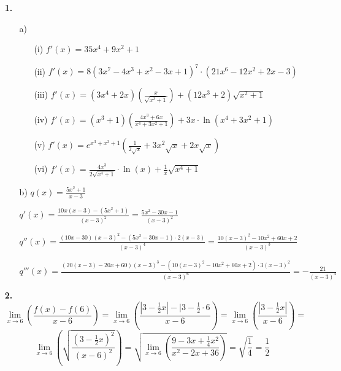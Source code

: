 \documentclass[a4paper,11pt]{scrartcl}
\author{\authorinfo}
\title{\titleinfo}
\date{\today}
\newcommand{\bra}[1]{\left(#1\right)}
\begin{document}
\maketitle
\begin{enumerate}
    \item[\textbf{1.}]
    \begin{enumerate}
        \item[a)]
        \begin{enumerate}
            \item[(i)]  \( f'(x) = 35x^4 + 9x^2 + 1 \)
            \item[(ii)] \( f'(x) = 8(3x^7 - 4x^3 + x^2 - 3x + 1)^7 \cdot (21x^6 - 12x^2 + 2x -3) \)
            \item[(iii)]\( f'(x) = (3x^4 + 2x)(\frac{x}{\sqrt{x^2+1}}) + (12x^3 + 2) \sqrt{x^2 + 1} \)
            \item[(iv)] \( f'(x) = (x^3 + 1)(\frac{4x^3+6x}{x^4+3x^2+1}) + 3x \cdot \ln\bra{x^4+3x^2+1} \)
            \item[(v)]  \( f'(x) = e^{x^3 + x^2 +1} \bra{\frac{1}{2\sqrt{x}} + 3x^2\sqrt{x} + 2x\sqrt{x}} \)
            \item[(vi)] \( f'(x) = \frac{4x^3}{2\sqrt{x^4+1}} \cdot \ln(x) + \frac{1}{x} \sqrt{x^4 + 1} \)
        \end{enumerate}

        \item[b)]
            \( q(x) = \frac{5x^2+1}{x-3} \)

            \( q'(x) = \frac{10x(x - 3) - (5x^2 + 1)}{(x-3)^2} = \frac{5x^2 - 30x - 1}{(x-3)^2} \)

            \( q''(x) = \frac{(10x - 30)(x-3)^2 - (5x^2 - 30x - 1) \cdot 2(x-3)}{(x-3)^4}
            = \frac{10 (x-3)^2 - 10x^2 + 60x + 2}{(x-3)^3} \)

            \( q'''(x) = \frac{\bra{20(x-3)-20x+60}(x-3)^3 - \bra{10(x-3)^2-10x^2+60x+2} \cdot 3(x-3)^2}{(x-3)^6}
            = -\frac{21}{(x-3)^4} \)
    \end{enumerate}

    \item[\textbf{2.}]
        \[
            \lim\limits_{x \rightarrow 6}\bra{\frac{f(x) - f(6)}{x-6}} =
            \lim\limits_{x \rightarrow 6}\bra{\frac{|3 - \frac{1}{2}x| - |3 - \frac{1}{2} \cdot 6}{x-6}} =
            \lim\limits_{x \rightarrow 6}\bra{\frac{|3 - \frac{1}{2}x|}{x-6}} = \]
        \[
            \lim\limits_{x \rightarrow 6}\bra{\sqrt{\frac{(3 - \frac{1}{2}x)^2}{(x-6)^2}}} =
            \sqrt{\lim\limits_{x \rightarrow 6}\bra{\frac{9 - 3x + \frac{1}{4}x^2}{x^2 - 2x + 36}}} =
            \sqrt{\frac{1}{4}} = \frac{1}{2}
        \]


\end{enumerate}
\end{document}
